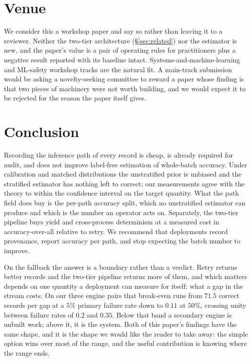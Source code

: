 \documentclass[11pt,a4paper]{article}
\begin{document}
\section{Venue}

We consider this a workshop paper and say so rather than leaving it to a reviewer.
Neither the two-tier architecture (\S\ref{sec:related}) nor the estimator is new,
and the paper's value is a pair of operating rules for practitioners plus a
negative result reported with its baseline intact. Systems-and-machine-learning and
ML-safety workshop tracks are the natural fit. A main-track submission would be
asking a novelty-seeking committee to reward a paper whose finding is that two
pieces of machinery were not worth building, and we would expect it to be rejected
for the reason the paper itself gives.

\section{Conclusion}

Recording the inference path of every record is cheap, is already required for
audit, and does not improve label-free estimation of whole-batch accuracy. Under
calibration and matched distributions the unstratified prior is unbiased and the
stratified estimator has nothing left to correct; our measurements agree with the
theory to within the confidence interval on the target quantity. What the path
field does buy is the per-path accuracy split, which no unstratified estimator can
produce and which is the number an operator acts on. Separately, the two-tier
pipeline buys yield and cross-process determinism at a measured cost in
accuracy-over-all relative to retry. We recommend that deployments record
provenance, report accuracy per path, and stop expecting the batch number to
improve.

On the fallback the answer is a boundary rather than a verdict. Retry returns
better records and the two-tier pipeline returns more of them, and which matters
depends on one quantity a deployment can measure for itself: what a gap in the
stream costs. On our three engine pairs that break-even runs from $71.5$ correct
records per gap at a $5\%$ primary failure rate down to $0.11$ at $50\%$, crossing
unity between failure rates of $0.2$ and $0.35$. Below that band a secondary engine
is unbuilt work; above it, it is the system. Both of this paper's findings have the
same shape, and it is the shape we would like the reader to take away: the simple
option wins over most of the range, and the useful contribution is knowing where
the range ends.
\end{document}

